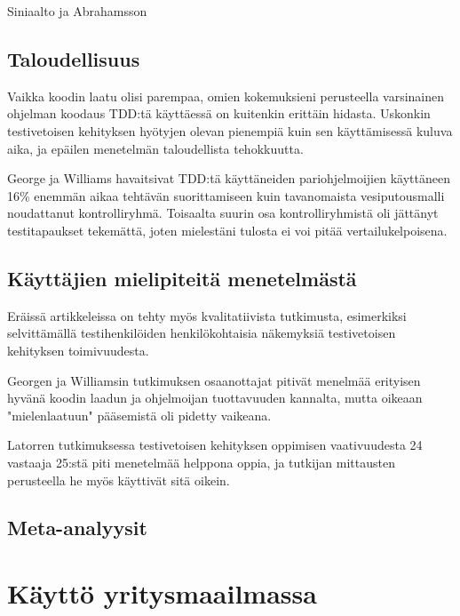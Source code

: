 \documentclass[finnish]{tktltiki2}
\theoremstyle{definition}
\theoremstyle{remark}
\begin{document}
Siniaalto ja Abrahamsson \cite{Siniaalto07}



\subsection{Taloudellisuus}

Vaikka koodin laatu olisi parempaa, omien kokemuksieni perusteella varsinainen ohjelman koodaus TDD:tä käyttäessä on kuitenkin erittäin hidasta. Uskonkin testivetoisen kehityksen hyötyjen olevan pienempiä kuin sen käyttämisessä kuluva aika, ja epäilen menetelmän taloudellista tehokkuutta.

George ja Williams \cite{George04} havaitsivat TDD:tä käyttäneiden pariohjelmoijien käyttäneen 16\% enemmän aikaa tehtävän suorittamiseen kuin tavanomaista vesiputousmalli noudattanut kontrolliryhmä. Toisaalta suurin osa kontrolliryhmistä oli jättänyt testitapaukset tekemättä, joten mielestäni tulosta ei voi pitää vertailukelpoisena.


\subsection{Käyttäjien mielipiteitä menetelmästä}

Eräissä artikkeleissa on tehty myös kvalitatiivista tutkimusta, esimerkiksi selvittämällä testihenkilöiden henkilökohtaisia näkemyksiä testivetoisen kehityksen toimivuudesta.

Georgen ja Williamsin \cite{George04} tutkimuksen osaanottajat pitivät menelmää erityisen hyvänä koodin laadun ja ohjelmoijan tuottavuuden kannalta, mutta oikeaan "mielenlaatuun" pääsemistä oli pidetty vaikeana.

Latorren \cite{Latorre14} tutkimuksessa testivetoisen kehityksen oppimisen vaativuudesta 24 vastaaja 25:stä piti menetelmää helppona oppia, ja tutkijan mittausten perusteella he myös käyttivät sitä oikein.


\subsection{Meta-analyysit}




\section{Käyttö yritysmaailmassa}
\end{document}
